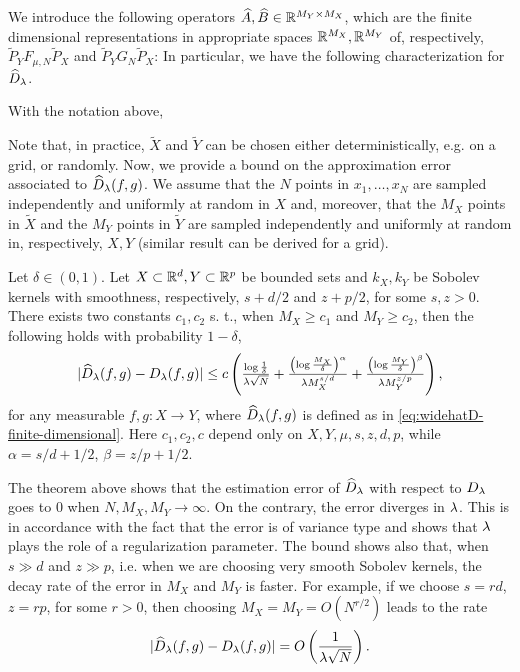 We introduce the following operators $\widehat{A}, \widehat{B} \in \mathbb R^{M_Y \times M_X}$, which are the finite dimensional representations in appropriate spaces $\mathbb R^{M_X}, \mathbb R^{M_Y}$ of, respectively, $\tilde{P}_Y F_{\mu, N} \tilde{P}_X$ and $\tilde{P}_Y G_N \tilde{P}_X$:
In particular, we have the following characterization for $\widehat{D}_\lambda$.
\begin{lemma}\label{lm:widehatD}
With the notation above,
\end{lemma}

Note that, in practice, $\widetilde X$ and $\widetilde Y$ can be chosen either deterministically, e.g. on a grid, or randomly. Now, we provide a bound on the approximation error associated to $\widehat{D}_\lambda(f,g)$. We assume that the $N$ points in $x_1,\dots, x_N$ are sampled independently and uniformly at random in $X$ and, moreover, that the $M_X$ points in $\widetilde{X}$ and the $M_Y$ points in $\widetilde{Y}$ are sampled independently and uniformly at random in, respectively, $X, Y$ (similar result can be derived for a grid).
\begin{theorem}\label{thm:appr-error-widehatD}
Let $\delta \in (0,1)$. Let $X \subset \mathbb R^d, Y \subset \mathbb R^p$ be bounded sets and $k_X, k_Y$ be Sobolev kernels with smoothness, respectively, $s + d/2$ and $z+p/2$, for some $s,z > 0$. There exists two constants $c_1, c_2$ s. t., when $M_X \geq c_1$ and $M_Y \geq c_2$, then the following holds with probability $1-\delta$,
$$|\widehat{D}_\lambda(f,g) - D_\lambda(f,g)| \leq c\left(\tfrac{\log\frac{1}{\delta}}{\lambda\sqrt{N}} + \tfrac{\left(\log \frac{M_X}{\delta}\right)^{\alpha}}{\lambda M_X^{s/d}} + \tfrac{\left(\log\frac{M_Y}{\delta}\right)^{\beta}}{\lambda M_Y^{z/p}}\right),$$
for any measurable $f,g : X \to Y$, where $\widehat{D}_\lambda(f,g)$ is defined as in \cref{eq:widehatD-finite-dimensional}. Here $c_1, c_2, c$ depend only on $X, Y, \mu, s, z, d, p$, while $\alpha = s/d+1/2$, $\beta = z/p+1/2$.
\end{theorem}

The theorem above shows that the estimation error of $\widehat{D}_\lambda$ with respect to $D_\lambda$ goes to $0$ when $N, M_X, M_Y \to \infty$. On the contrary, the error diverges in $\lambda$. This is in accordance with the fact that the error is of variance type and shows that $\lambda$ plays the role of a regularization parameter. The bound shows also that, when $s \gg d$ and $z \gg p$, i.e. when we are choosing very smooth Sobolev kernels, the decay rate of the error in $M_X$ and $M_Y$ is faster. For example, if we choose $s = r d$, $z = r p$, for some $r > 0$, then choosing $M_X = M_Y =  O(N^{r/2})$ leads to the rate
$$ |\widehat{D}_\lambda(f,g) - D_\lambda(f,g)| = O\left(\frac{1}{\lambda \sqrt{N}}\right).$$

